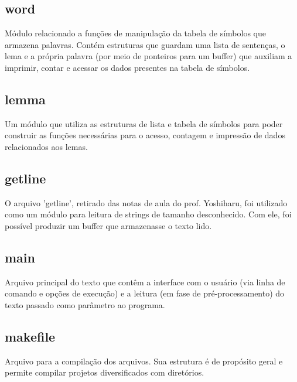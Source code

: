 \documentclass[a4paper,12pt]{article}
\begin{document}
    \subsection{word} 
        Módulo relacionado a funções de manipulação da tabela de
        símbolos que armazena palavras. Contém estruturas que guardam
        uma lista de sentenças, o lema e a própria palavra (por meio de 
        ponteiros para um buffer) que auxiliam a imprimir, contar e 
        acessar os dados presentes na tabela de símbolos.

    \subsection{lemma} 

        Um módulo que utiliza as estruturas de lista e tabela de
        símbolos para poder construir as funções necessárias para o
        acesso, contagem e impressão de dados relacionados aos lemas.

    \subsection{getline}
        
        O arquivo 'getline', retirado das notas de aula do prof.
        Yoshiharu, foi utilizado como um módulo para leitura de strings
        de tamanho desconhecido. Com ele, foi possível produzir um
        buffer que armazenasse o texto lido.

    \subsection{main} 
        Arquivo principal do texto que contêm a interface com o usuário
        (via linha de comando e opções de execução) e a leitura (em fase
        de pré-processamento) do texto passado como parâmetro ao
        programa.

    \subsection{makefile} 
        Arquivo para a compilação dos arquivos. Sua estrutura é de
        propósito geral e permite compilar projetos diversificados com
        diretórios.
        
\end{document}
